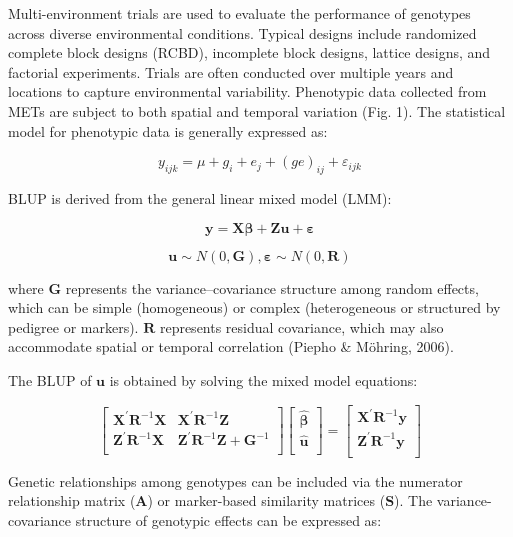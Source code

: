 \documentclass[
]{article}
\begin{document}
Multi-environment trials are used to evaluate the performance of
genotypes across diverse environmental conditions. Typical designs
include randomized complete block designs (RCBD), incomplete block
designs, lattice designs, and factorial experiments. Trials are often
conducted over multiple years and locations to capture environmental
variability. Phenotypic data collected from METs are subject to both
spatial and temporal variation (Fig. 1). The statistical model for
phenotypic data is generally expressed as:

\[y_{ijk} = \mu + g_{i} + e_{j} + (ge)_{ij} + \varepsilon_{ijk}
\]

BLUP is derived from the general linear mixed model (LMM):

\[\mathbf{y} = \mathbf{X}\mathbf{\beta} + \mathbf{Zu} + \mathbf{\varepsilon}\mathbf{
}\]

\[\mathbf{u} \sim N(0,\mathbf{G}),\mathbf{\varepsilon} \sim N(0,\mathbf{R})\]

where \(\mathbf{G}\) represents the variance--covariance structure among
random effects, which can be simple (homogeneous) or complex
(heterogeneous or structured by pedigree or markers). \(\mathbf{R}\)
represents residual covariance, which may also accommodate spatial or
temporal correlation (Piepho \& Möhring, 2006).

The BLUP of \(\mathbf{u}\) is obtained by solving the mixed model
equations:

\[\begin{bmatrix}
\mathbf{X}^{'}\mathbf{R}^{- 1}\mathbf{X} & \mathbf{X}^{'}\mathbf{R}^{- 1}\mathbf{Z} \\
\mathbf{Z}^{'}\mathbf{R}^{- 1}\mathbf{X} & \mathbf{Z}^{'}\mathbf{R}^{- 1}\mathbf{Z} + \mathbf{G}^{- 1} \\
\end{bmatrix}\begin{bmatrix}
\widehat{\mathbf{\beta}} \\
\widehat{\mathbf{u}} \\
\end{bmatrix} = \begin{bmatrix}
\mathbf{X}^{'}\mathbf{R}^{- 1}\mathbf{y} \\
\mathbf{Z}^{'}\mathbf{R}^{- 1}\mathbf{y} \\
\end{bmatrix}
\]

Genetic relationships among genotypes can be included via the numerator
relationship matrix (\(\mathbf{A}\)) or marker-based similarity matrices
(\(\mathbf{S}\)). The variance-covariance structure of genotypic effects
can be expressed as:
\end{document}
